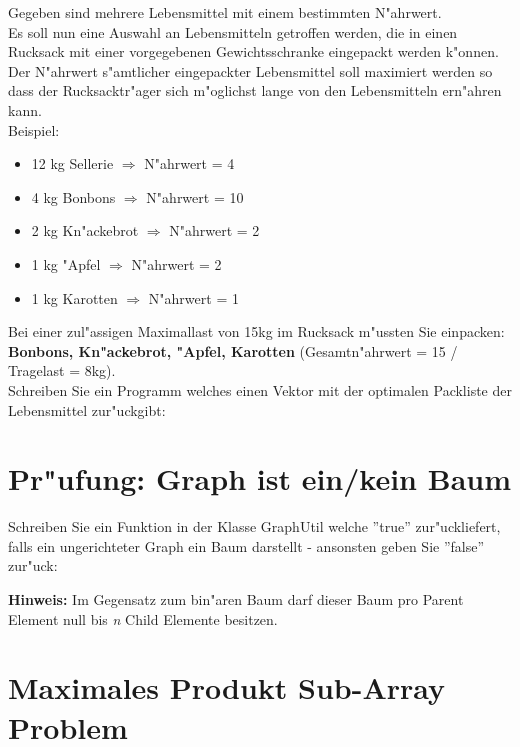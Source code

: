 \documentclass[a4paper,10pt]{article}
\begin{document}
Gegeben sind mehrere Lebensmittel mit einem bestimmten N"ahrwert. \\

Es soll nun eine Auswahl an Lebensmitteln getroffen werden, die in einen Rucksack mit einer vorgegebenen Gewichtsschranke eingepackt werden k"onnen. \\

Der N"ahrwert s"amtlicher eingepackter Lebensmittel soll maximiert werden so dass der Rucksacktr"ager sich m"oglichst lange von den Lebensmitteln ern"ahren kann. \\

Beispiel:

\begin{itemize}
	\item 12 kg Sellerie $\Rightarrow$ N"ahrwert = 4
	\item 4  kg Bonbons $\Rightarrow$ N"ahrwert = 10
	\item 2  kg Kn"ackebrot $\Rightarrow$ N"ahrwert = 2
	\item 1  kg "Apfel $\Rightarrow$ N"ahrwert = 2
	\item 1  kg Karotten $\Rightarrow$ N"ahrwert = 1
\end{itemize}

Bei einer zul"assigen Maximallast von 15kg im Rucksack m"ussten Sie einpacken: \textbf{Bonbons, Kn"ackebrot, "Apfel, Karotten} (Gesamtn"ahrwert = 15 / Tragelast = 8kg). \\

Schreiben Sie ein Programm welches einen Vektor mit der optimalen Packliste der Lebensmittel zur"uckgibt: 

{ \small

}

\section{Pr"ufung: Graph ist ein/kein Baum}

Schreiben Sie ein Funktion in der Klasse GraphUtil welche ''true'' zur"uckliefert, falls ein ungerichteter Graph ein Baum darstellt - ansonsten geben Sie ''false'' zur"uck:

{ \small

}

\textbf{Hinweis:} Im Gegensatz zum bin"aren Baum darf dieser Baum pro Parent Element null bis \textit{n} Child Elemente besitzen.

\section{Maximales Produkt Sub-Array Problem}
\end{document}
